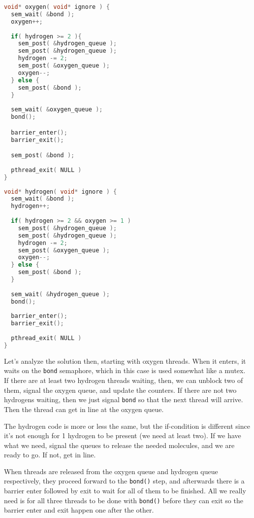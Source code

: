 \begin{multicols}{2}
	\begin{lstlisting}[language=C]
void* oxygen( void* ignore ) {
  sem_wait( &bond );
  oxygen++;
  
  if( hydrogen >= 2 ){
    sem_post( &hydrogen_queue );
    sem_post( &hydrogen_queue );
    hydrogen -= 2;
    sem_post( &oxygen_queue );
    oxygen--;
  } else {
    sem_post( &bond );
  }
  
  sem_wait( &oxygen_queue );
  bond();

  barrier_enter();
  barrier_exit();

  sem_post( &bond );
  
  pthread_exit( NULL )
}
\end{lstlisting}
	\columnbreak
	\begin{lstlisting}[language=C]
void* hydrogen( void* ignore ) {
  sem_wait( &bond );
  hydrogen++;
  
  if( hydrogen >= 2 && oxygen >= 1 )
    sem_post( &hydrogen_queue );
    sem_post( &hydrogen_queue );
    hydrogen -= 2;
    sem_post( &oxygen_queue );
    oxygen--;
  } else {
    sem_post( &bond );
  }
  
  sem_wait( &hydrogen_queue );
  bond();
  
  barrier_enter();
  barrier_exit();
  
  pthread_exit( NULL )
}
\end{lstlisting}
\end{multicols}


Let's analyze the solution then, starting with oxygen threads. When it enters, it waits on the \texttt{bond} semaphore, which in this case is used somewhat like a mutex. If there are at least two hydrogen threads waiting, then, we can unblock two of them, signal the oxygen queue, and update the counters. If there are not two hydrogens waiting, then we just signal \texttt{bond} so that the next thread will arrive. Then the thread can get in line at the oxygen queue.

The hydrogen code is more or less the same, but the if-condition is different since it's not enough for 1 hydrogen to be present (we need at least two). If we have what we need, signal the queues to release the needed molecules, and we are ready to go. If not, get in line.

When threads are released from the oxygen queue and hydrogen queue respectively, they proceed forward to the \texttt{bond()} step, and afterwards there is a barrier enter followed by exit to wait for all of them to be finished. All we really need is for all three threads to be done with \texttt{bond()} before they can exit so the barrier enter and exit happen one after the other.

